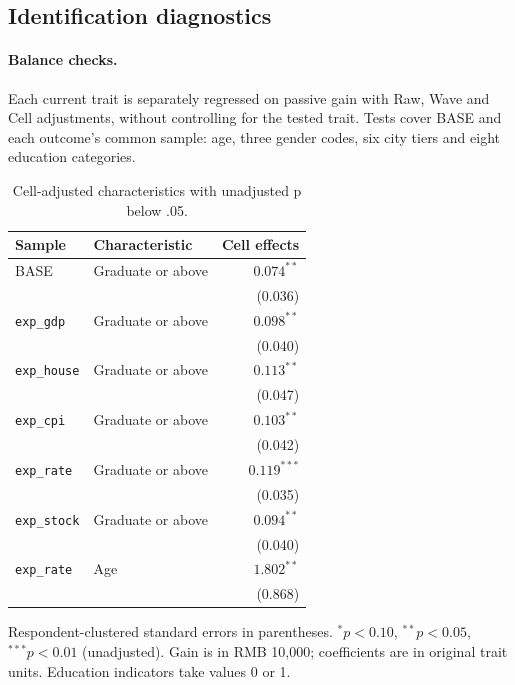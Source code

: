 \documentclass[11pt,letterpaper,english,final]{article}
\begin{document}
\clearpage
\subsection{Identification diagnostics}
\paragraph{Balance checks.}
Each current trait is separately regressed on passive gain with Raw, Wave and Cell adjustments, without controlling for the tested trait. Tests cover BASE and each outcome's common sample: age, three gender codes, six city tiers and eight education categories.

\begin{table}[H]
\centering\small
\setlength{\tabcolsep}{5pt}
\caption{Cell-adjusted characteristics with unadjusted p below .05.}
\begin{tabular}{llr}
\toprule
Sample & Characteristic & Cell effects \\
\midrule
BASE & Graduate or above & $\bm{0.074}^{**}$ \\
 & & (0.036) \\[3pt]
\texttt{exp\_gdp} & Graduate or above & $\bm{0.098}^{**}$ \\
 & & (0.040) \\[3pt]
\texttt{exp\_house} & Graduate or above & $\bm{0.113}^{**}$ \\
 & & (0.047) \\[3pt]
\texttt{exp\_cpi} & Graduate or above & $\bm{0.103}^{**}$ \\
 & & (0.042) \\[3pt]
\texttt{exp\_rate} & Graduate or above & $\bm{0.119}^{***}$ \\
 & & (0.035) \\[3pt]
\texttt{exp\_stock} & Graduate or above & $\bm{0.094}^{**}$ \\
 & & (0.040) \\[3pt]
\texttt{exp\_rate} & Age & $\bm{1.802}^{**}$ \\
 & & (0.868) \\[3pt]
\bottomrule
\end{tabular}
\par\vspace{4pt}\begin{minipage}{\linewidth}\footnotesize Respondent-clustered standard errors in parentheses. $^{*}p<0.10$, $^{**}p<0.05$, $^{***}p<0.01$ (unadjusted). Gain is in RMB 10,000; coefficients are in original trait units. Education indicators take values 0 or 1.\end{minipage}
\end{table}
\end{document}
